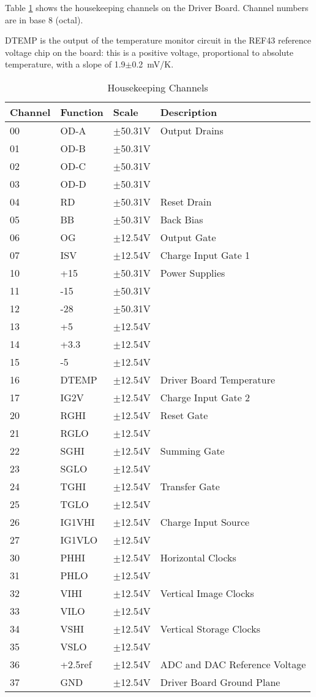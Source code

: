 \documentclass[a4paper,12pt]{article}
\begin{document}
Table \ref{HKC} shows the housekeeping channels on the Driver Board. Channel numbers are in base 8 (octal). 

DTEMP is the output of the temperature monitor circuit in the REF43 reference voltage chip on the board: this is a positive voltage, proportional to absolute temperature, with a slope of 1.9$\pm$0.2\ mV/K.

\begin{table}[h]
\centering
\begin{tabular}{|l|l|l|l|}
\hline
Channel & Function & Scale& Description\\
\hline
00 & OD-A & $\pm$50.31V & Output Drains \\
01 & OD-B & $\pm$50.31V &\\
02 & OD-C & $\pm$50.31V& \\
03 & OD-D & $\pm$50.31V& \\
\hline
04 & RD & $\pm$50.31V & Reset Drain\\
\hline
05 & BB & $\pm$50.31V & Back Bias \\
\hline
06 & OG &  $\pm$12.54V & Output Gate \\
\hline
07 & ISV & $\pm$12.54V & Charge Input Gate 1\\
\hline
10 & +15 & $\pm$50.31V & Power Supplies\\
11 & -15 & $\pm$50.31V & \\
12 & -28 & $\pm$50.31V &\\
13 & +5 & $\pm$12.54V &\\
14 & +3.3&  $\pm$12.54V &\\
15 & -5 &$\pm$12.54V& \\
\hline
16 & DTEMP &$\pm$12.54V & Driver Board Temperature\\
\hline
17 & IG2V & $\pm$12.54V& Charge Input Gate 2 \\
\hline
20 & RGHI & $\pm$12.54V & Reset Gate\\
21 & RGLO & $\pm$12.54V & \\
\hline
22 & SGHI & $\pm$12.54V & Summing Gate \\
23 & SGLO & $\pm$12.54V & \\
\hline
24 & TGHI & $\pm$12.54V & Transfer Gate\\
25 & TGLO & $\pm$12.54V & \\
\hline
26 & IG1VHI & $\pm$12.54V & Charge Input Source\\
27 & IG1VLO & $\pm$12.54V& \\
\hline
30 & PHHI & $\pm$12.54V & Horizontal Clocks\\
31 & PHLO & $\pm$12.54V &\\
\hline
32 & VIHI & $\pm$12.54V & Vertical Image Clocks\\
33 & VILO & $\pm$12.54V &\\
\hline
34 & VSHI & $\pm$12.54V & Vertical Storage Clocks\\
35 & VSLO & $\pm$12.54V &\\
\hline
36 & +2.5ref & $\pm$12.54V & ADC and DAC Reference Voltage\\
\hline
37 & GND & $\pm$12.54V & Driver Board Ground Plane\\
\hline
\end{tabular}
\caption{Housekeeping Channels}
\label{HKC}
\end{table}
\end{document}
